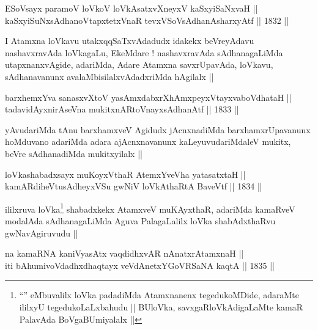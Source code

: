 
\begin{shl}
ESoV\s sayx paramoV loVkoV loVkAsatxvXneyxV kaSxyiSaNxvaH || \\
kaSxyiSuNxsAdhanoVtapxtetxVnaR tevxVSoV\s sAdhanAsharxyAtf ||  1832 ||  
\end{shl}

\begin{artha}
I Atamxna loVkavu utakxqqSaTxvAdadudx idakekx beVreyAdavu
nashavxravAda loVkagaLu, EkeMdare ! nashavxravAda sAdhanagaLiMda
utapxnanxvAgide, adariMda, Adare Atamxna savxrUpavAda, loVkavu,
sAdhanavanunx avalaMbisilalxvAdadxriMda hAgilalx ||
\end{artha}

\begin{shl}
barxhemxYva sanasxvXtoV yasAmxdabxrXhAmxpeyxVtayxvaboVdhataH || \\
tadavidAyxnirAseVna mukitxnARtoV\s nayxsAdhanAtf ||  1833 ||  
\end{shl}

\begin{artha}
yAvudariMda tAnu barxhamxveV Agidudx jAcnxnadiMda barxhamxrUpavanunx
hoMduvano adariMda adara ajAcnxnavanunx kaLeyuvudariMdaleV mukitx,
beVre sAdhanadiMda mukitxyilalx ||
\end{artha}


\begin{shl}
loVkashabadxsayx muKoyxV\s thaR AtemxYveVha yatasatxtaH || \\
kamARdiheVtusAdheyxVSu gwNiV loVkAthaRtA BaveVtf ||  1834 ||  
\end{shl}

\begin{artha}
ililxruva loVka\footnote[1]{``\stext'' eMbuvalilx loVka padadiMda
Atamxnanenx tegedukoMDide, adaraMte ililxyU tegedukoLaLxbahudu ||
BUloVka, savxgaRloVkAdigaLaMte kamaR PalavAda BoVgaBUmiyalalx ||} shabadxkekx AtamxveV muKAyxthaR,
adariMda kamaRveV modalAda sAdhanagaLiMda Aguva PalagaLalilx loVka
shabAdxthaRvu gwNavAgiruvudu ||
\end{artha}


\begin{shl}
na kamaRNA kaniVyasAtx vaqdidhxvAR nAnatxrAtamxnaH ||  \\
iti bAhumivoVdadhxdhaqtayx veVdAnetxYGoVRSaNA kaqtA ||  1835 ||  
\end{shl}

